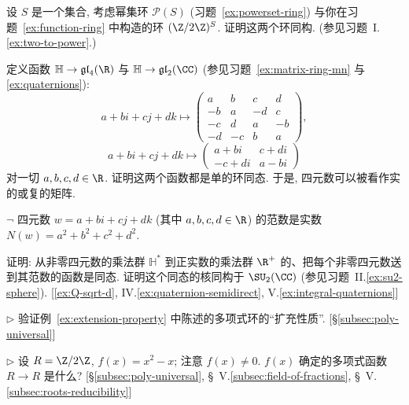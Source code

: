 \begin{prob}
\label{ex:powerset-iso}
设 $S$ 是一个集合, 考虑幂集环 $\mathscr{P}(S)$ (习题~\ref{ex:powerset-ring}) 与你在习题~\ref{ex:function-ring} 中构造的环 $(\Z/2\Z)^S$. 证明这两个环同构. (参见习题~I.\ref{ex:two-to-power}.)
\end{prob}

\begin{prob}
\label{ex:quaternion-matrices}
定义函数 $\mathbb{H} \to \mathfrak{gl}_4(\R)$ 与 $\mathbb{H} \to \mathfrak{gl}_2(\CC)$ (参见习题~\ref{ex:matrix-ring-mn} 与 \ref{ex:quaternions}):
\[
a + bi + cj + dk \mapsto \begin{pmatrix} a & b & c & d \\ -b & a & -d & c \\ -c & d & a & -b \\ -d & -c & b & a \end{pmatrix},
\]
\[
a + bi + cj + dk \mapsto \begin{pmatrix} a + bi & c + di \\ -c + di & a - bi \end{pmatrix}
\]
对一切 $a, b, c, d \in \R$. 证明这两个函数都是单的环同态. 于是, 四元数可以被看作实的或复的矩阵.
\end{prob}

\begin{prob}
\label{ex:quaternion-norm}
$\neg$ 四元数 $w = a + bi + cj + dk$ (其中 $a, b, c, d \in \R$) 的范数是实数 $N(w) = a^2 + b^2 + c^2 + d^2$.

证明: 从非零四元数的乘法群 $\mathbb{H}^{*}$ 到正实数的乘法群 $\R^{+}$ 的、把每个非零四元数送到其范数的函数是同态. 证明这个同态的核同构于 $\SU_2(\CC)$ (参见习题~II.\ref{ex:su2-sphere}). [\ref{ex:Q-sqrt-d}, IV.\ref{ex:quaternion-semidirect}, V.\ref{ex:integral-quaternions}]
\end{prob}

\begin{prob}
\label{ex:extension-property-check}
$\triangleright$ 验证例~\ref{ex:extension-property} 中陈述的多项式环的``扩充性质''. [\S\ref{subsec:poly-universal}]
\end{prob}

\begin{prob}
\label{ex:poly-function}
$\triangleright$ 设 $R = \Z/2\Z$, $f(x) = x^2 - x$; 注意 $f(x) \neq 0$. $f(x)$ 确定的多项式函数 $R \to R$ 是什么? [\S\ref{subsec:poly-universal}, \S~V.\ref{subsec:field-of-fractions}, \S~V.\ref{subsec:roots-reducibility}]
\end{prob}

